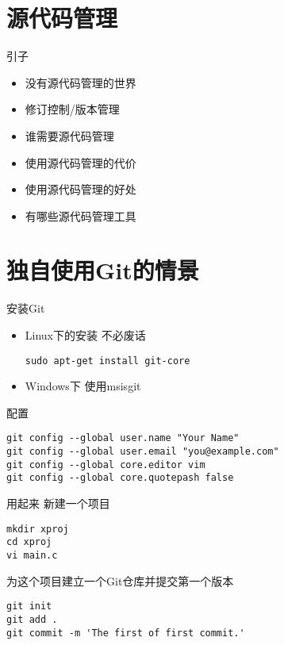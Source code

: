 \part{源代码管理}
\begin{frame}[<+->]{引子}
\begin{itemize}
  \item 没有源代码管理的世界
  \item 修订控制/版本管理
  \item 谁需要源代码管理
  \item 使用源代码管理的代价
  \item 使用源代码管理的好处
  \item 有哪些源代码管理工具
\end{itemize}
\end{frame}

\part{独自使用Git的情景}
\begin{frame}[<+->][fragile]{安装Git}
\begin{itemize}
  \item Linux下的安装
  不必废话
\begin{Verbatim}[frame=single,commandchars=\\\{\}]
sudo apt-get install git-core
\end{Verbatim}

  \item Windows下
  使用msisgit
\end{itemize}
\end{frame}

\begin{frame}[<+->][fragile]{配置}
\begin{Verbatim}[frame=single,commandchars=\\\{\}]
git config --global user.name "Your Name"
git config --global user.email "you@example.com"
git config --global core.editor vim
git config --global core.quotepash false
\end{Verbatim}
\end{frame}

\begin{frame}[<+->][fragile]{用起来}
\onslide<+->
新建一个项目
\begin{Verbatim}[frame=single,commandchars=\\\{\}]
mkdir xproj
cd xproj
vi main.c
\end{Verbatim}

\onslide<+->
为这个项目建立一个Git仓库并提交第一个版本
\begin{Verbatim}[frame=single,commandchars=\\\{\}]
git init
git add .
git commit -m 'The first of first commit.'
\end{Verbatim}
\end{frame}

